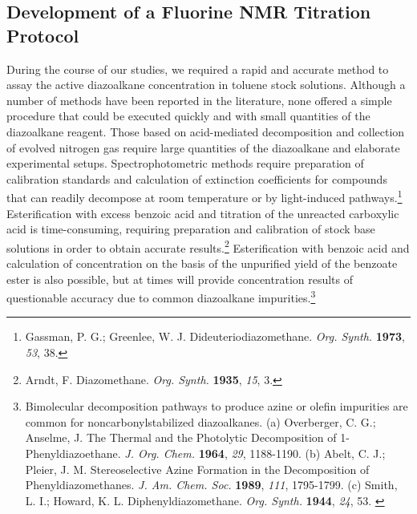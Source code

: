 \subsection{Development of a Fluorine NMR Titration Protocol}
During the course of our studies, we required a rapid and accurate
method to assay the active diazoalkane concentration in toluene stock solutions.
Although a number of methods have been reported in the literature, none offered
a simple procedure that could be executed quickly and with small quantities of
the diazoalkane reagent. Those based on acid-mediated decomposition and collection
of evolved nitrogen gas require large quantities of the diazoalkane and
elaborate experimental setups. Spectrophotometric methods require
preparation of calibration standards and calculation of extinction coefficients
for compounds that can readily decompose at room temperature or by light-induced
pathways.\footnote{{\frenchspacing Gassman, P. G.; Greenlee, W. J. Dideuteriodiazomethane.
\textit{Org. Synth.} \textbf{1973}, \textit{53}, 38.}} Esterification with excess benzoic acid and titration of the unreacted carboxylic acid is time-consuming, requiring preparation and
calibration of stock base solutions in order to obtain accurate
results.\footnote{{\frenchspacing Arndt, F. Diazomethane. \textit{Org. Synth.} \textbf{1935},
\textit{15}, 3.}} Esterification with benzoic acid and calculation of concentration on the basis of the unpurified yield of the benzoate ester is also
possible, but at times will provide concentration results of questionable
accuracy due to common diazoalkane impurities.\footnote{Bimolecular decomposition pathways to
produce azine or olefin impurities are common for noncarbonylstabilized diazoalkanes. (a)
{\frenchspacing Overberger, C. G.; Anselme, J. The Thermal and the Photolytic Decomposition of
1-Phenyldiazoethane. \textit{J. Org. Chem.} \textbf{1964}, \textit{29}, 1188-1190.} (b)
{\frenchspacing Abelt, C. J.; Pleier, J. M. Stereoselective Azine Formation in the Decomposition of
Phenyldiazomethanes. \textit{J. Am. Chem. Soc.} \textbf{1989}, \textit{111}, 1795-1799.} (c)
{\frenchspacing Smith, L. I.; Howard, K. L. Diphenyldiazomethane. \textit{Org. Synth.}
\textbf{1944}, \textit{24}, 53.} \label{ref:asdiazodecomp}}

